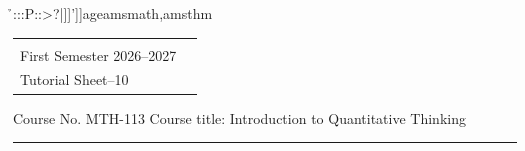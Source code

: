 ̉:::P::>?|]]']]age{amsmath,amsthm}
\usepackage{graphicx}
\usepackage[margin=0.7in]{geometry}

\usepackage{enumitem}

\usepackage{comment}
\usepackage{multirow}
\usepackage{tikz}
\usepackage{wrapfig}
\usepackage[autostyle=true]{csquotes}

\usepackage{pgfplots}
\usepackage{pgf-pie} %
\pgfplotsset{compat=1.18}
\usepackage{filecontents} %


\usepackage{fancyhdr}
\pagestyle{fancy}
\fancyhf{} %
\fancyfoot[C]{\bf ************************************} %

%



\hspace*{1.9cm}%
\begin{tabular}{@{}p{}p{}@{}}
 {\raggedright
   \begin{center} 
   \textbf{AZIM PREMJI UNIVERSITY, BHOPAL}\\
   First Semester 2026--2027 \\
   Tutorial Sheet--10
   \end{center}
  } %
\end{tabular}

\noindent Course No. MTH-113 \hfill  Course title: Introduction to Quantitative Thinking
\vspace{.3cm}
\hrule 
\vspace{.3cm}

